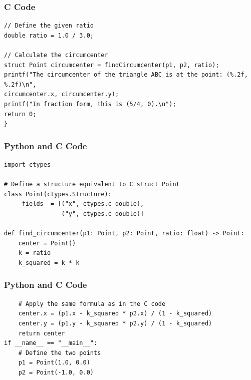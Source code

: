 \documentclass{beamer}
\begin{document}
\begin{frame}[fragile]
\frametitle{C Code}
\begin{lstlisting}
// Define the given ratio
double ratio = 1.0 / 3.0;

// Calculate the circumcenter
struct Point circumcenter = findCircumcenter(p1, p2, ratio);
printf("The circumcenter of the triangle ABC is at the point: (%.2f, %.2f)\n",
circumcenter.x, circumcenter.y);
printf("In fraction form, this is (5/4, 0).\n");
return 0;
}
\end{lstlisting}
\end{frame}

\begin{frame}[fragile]
\frametitle{Python and C Code}
\begin{lstlisting}
import ctypes

# Define a structure equivalent to C struct Point
class Point(ctypes.Structure):
    _fields_ = [("x", ctypes.c_double),
                ("y", ctypes.c_double)]

def find_circumcenter(p1: Point, p2: Point, ratio: float) -> Point:
    center = Point()
    k = ratio
    k_squared = k * k
\end{lstlisting}
\end{frame}

\begin{frame}[fragile]
\frametitle{Python and C Code}
\begin{lstlisting}
    # Apply the same formula as in the C code
    center.x = (p1.x - k_squared * p2.x) / (1 - k_squared)
    center.y = (p1.y - k_squared * p2.y) / (1 - k_squared)
    return center
if __name__ == "__main__":
    # Define the two points
    p1 = Point(1.0, 0.0)
    p2 = Point(-1.0, 0.0)
\end{lstlisting}
\end{frame}
\end{document}
